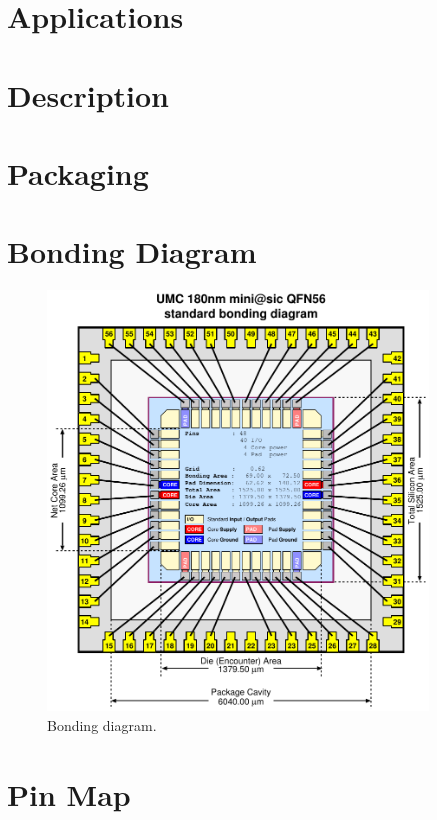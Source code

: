 \section{Applications}
\lipsum[2]

\section{Description}
\lipsum[2]

\section{Packaging}
\lipsum[2]

\section{Bonding Diagram}
\lipsum[2]

\begin{figure}[htbp]
  \centering \includegraphics[width=0.9\textwidth]{./figures/qfn56_180_std}
  \caption{Bonding diagram.}
\end{figure}

\section{Pin Map}
\lipsum[2]

